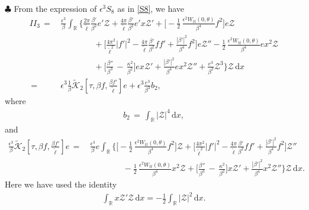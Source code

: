 \documentclass[10pt, reqno]{amsart}
\numberwithin{equation}{section}
\theoremstyle{definition}
\begin{document}
{\smallskip\noindent $\clubsuit$
 From the expression of $\epsilon^3 S_8$ as in \eqref{S8}, we have
\begin{align}\label{ESTIMATEII3}
II_{3}
\,=\,&\frac{\epsilon^3}\beta\int_{{\mathbb R}} \Bigg\{
 \frac{ 2\pi}{\tilde\ell} \frac{\beta'}{\beta^2} e'{\mathcal Z}
+\frac{4\pi}{{\tilde\ell}}\frac{\beta'}{\beta^2} e' x {\mathcal Z}'
+\Big[
-\frac{1}{2}\, \frac{\epsilon^2W_{tt}(0, \theta)}{\beta^4}f^2 \Big]e {\mathcal Z}
\nonumber\\[2mm]
&\qquad\qquad
+\Big[\frac{4\pi^2}{{\tilde\ell}^2}|f'|^2
-\frac{4\pi}{ {\tilde\ell}}\frac{\beta'}{\beta^2}ff'
+\frac{|\beta'|^2}{\beta^4} f^2
\Big]e{\mathcal Z}''
-\frac{1}{2}\, \frac{\epsilon^2W_{tt}(0, \theta)}{\beta^4} e x^2{\mathcal Z}
\nonumber\\[2mm]
&\qquad\qquad
+\Big[
\frac{\beta''} {\beta^3}
\,-\,\frac{\kappa^2}{\beta^2}
\Big]e x{\mathcal Z}'
+\frac{|\beta'|^2}{\beta^4} e x^2{\mathcal Z}''
+ \frac{e^3}{\beta^2} {\mathcal Z}^3
\Bigg\} {\mathcal Z} \,{\mathrm d}x
\nonumber\\[2mm]
\,=\,& \epsilon^3
\frac{1}{\beta} \tilde{\mathcal K}_{2}\left[\tau, {\beta f}, \frac{\beta { f}'}{\tilde\ell}\right] e + \epsilon^3\frac{e^3}{\beta^3}b_2 ,
\end{align}
where
\begin{align*}
b_2\,=\, \int_{\mathbb R} |\mathcal Z|^4 \,{\mathrm d}x,
\end{align*}
and
\begin{align*}
\frac{\epsilon^3}{\beta} \tilde{\mathcal K}_2\left[\tau, {\beta f}, \frac{\beta { f}'}{\tilde\ell}\right]e
\,=\,&\frac{\epsilon^3}\beta e\int_{{\mathbb R}} \Bigg\{
 \Big[
-\frac{1}{2}\, \frac{\epsilon^2W_{tt}(0, \theta)}{\beta^4}f^2 \Big] {\mathcal Z}
+\Big[\frac{4\pi^2}{{\tilde\ell}^2}|f'|^2
-\frac{4\pi}{ {\tilde\ell}}\frac{\beta'}{\beta^2}ff'
+\frac{|\beta'|^2}{\beta^4} f^2
\Big]{\mathcal Z}''
\nonumber\\[2mm]
&\qquad \qquad-\frac{1}{2}\, \frac{\epsilon^2W_{tt}(0, \theta)}{\beta^4} x^2{\mathcal Z}
+\Big[
\frac{\beta''} {\beta^3}
\,-\,\frac{\kappa^2}{\beta^2}
\Big] x{\mathcal Z}'
+\frac{|\beta'|^2}{\beta^4} x^2{\mathcal Z}''
\Bigg\} {\mathcal Z} \,{\mathrm d}x.
\end{align*}
Here we have used the identity
\begin{align*}
\int_{\mathbb R} x{\mathcal Z}'{\mathcal Z} \,{\mathrm d}x= - \frac12\int_{\mathbb R} |\mathcal Z|^2 \,{\mathrm d}x.
\end{align*}



}
\end{document}
